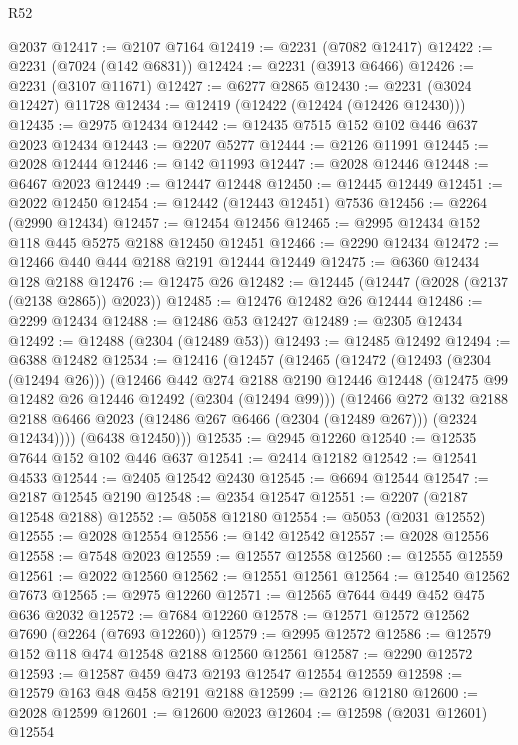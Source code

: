 \begin{lexlean}{R52}
\begin{coremodule}
    @2037
@12417 := @2107 @7164
@12419 := @2231 (@7082 @12417)
@12422 := @2231 (@7024 (@142 @6831))
@12424 := @2231 (@3913 @6466)
@12426 := @2231 (@3107 @11671)
@12427 := @6277 @2865
@12430 := @2231 (@3024 @12427) @11728
@12434 := @12419 (@12422 (@12424 (@12426 @12430)))
@12435 := @2975 @12434
@12442 := @12435 @7515 @152 @102 @446 @637 @2023 @12434
@12443 := @2207 @5277
@12444 := @2126 @11991
@12445 := @2028 @12444
@12446 := @142 @11993
@12447 := @2028 @12446
@12448 := @6467 @2023
@12449 := @12447 @12448
@12450 := @12445 @12449
@12451 := @2022 @12450
@12454 := @12442 (@12443 @12451) @7536
@12456 := @2264 (@2990 @12434)
@12457 := @12454 @12456
@12465 := @2995 @12434 @152 @118 @445 @5275 @2188 @12450 @12451
@12466 := @2290 @12434
@12472 := @12466 @440 @444 @2188 @2191 @12444 @12449
@12475 := @6360 @12434 @128 @2188
@12476 := @12475 @26
@12482 := @12445 (@12447 (@2028 (@2137 (@2138 @2865)) @2023))
@12485 := @12476 @12482 @26 @12444
@12486 := @2299 @12434
@12488 := @12486 @53 @12427
@12489 := @2305 @12434
@12492 := @12488 (@2304 (@12489 @53))
@12493 := @12485 @12492
@12494 := @6388 @12482
@12534 := @12416
    (@12457
      (@12465
        (@12472
          (@12493 (@2304 (@12494 @26)))
          (@12466
            @442
            @274
            @2188
            @2190
            @12446
            @12448
            (@12475 @99 @12482 @26 @12446 @12492 (@2304 (@12494 @99)))
            (@12466
              @272
              @132
              @2188
              @2188
              @6466
              @2023
              (@12486 @267 @6466 (@2304 (@12489 @267)))
              (@2324 @12434))))
        (@6438 @12450)))
@12535 := @2945 @12260
@12540 := @12535 @7644 @152 @102 @446 @637
@12541 := @2414 @12182
@12542 := @12541 @4533
@12544 := @2405 @12542 @2430
@12545 := @6694 @12544
@12547 := @2187 @12545 @2190
@12548 := @2354 @12547
@12551 := @2207 (@2187 @12548 @2188)
@12552 := @5058 @12180
@12554 := @5053 (@2031 @12552)
@12555 := @2028 @12554
@12556 := @142 @12542
@12557 := @2028 @12556
@12558 := @7548 @2023
@12559 := @12557 @12558
@12560 := @12555 @12559
@12561 := @2022 @12560
@12562 := @12551 @12561
@12564 := @12540 @12562 @7673
@12565 := @2975 @12260
@12571 := @12565 @7644 @449 @452 @475 @636 @2032
@12572 := @7684 @12260
@12578 := @12571 @12572 @12562 @7690 (@2264 (@7693 @12260))
@12579 := @2995 @12572
@12586 := @12579 @152 @118 @474 @12548 @2188 @12560 @12561
@12587 := @2290 @12572
@12593 := @12587 @459 @473 @2193 @12547 @12554 @12559
@12598 := @12579 @163 @48 @458 @2191 @2188
@12599 := @2126 @12180
@12600 := @2028 @12599
@12601 := @12600 @2023
@12604 := @12598 (@2031 @12601) @12554

\end{coremodule}
\end{lexlean}
